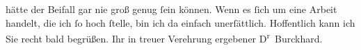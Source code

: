 \begin{ledgroupsized}[t]{13cm}
                    hätte der Beifall gar nie groß genug ſein können. Wenn es ſich um eine Arbeit
                    handelt, die ich ſo hoch ſtelle, bin ich da einfach unerſättlich. Hoffentlich
                    kann ich Sie recht bald begrüßen.\pend
           \pstart Ihr in treuer Verehrung ergebener \spacefill\mbox{D\textsuperscript{r}
                        Burckhard.}\pend{}          \endnumbering{}\end{ledgroupsized}  \newcommand{\dateiname}{L01987}\newcommand{\titel}{Max Burckhard an Arthur Schnitzler, 25. 11. 1910}\newcommand{\editorInnen}{Martin Anton Müller und Gerd-Hermann Susen}
            \footnotesize
\begin{ledgroupsized}[t]{11.5cm}
\end{ledgroupsized}
         
      